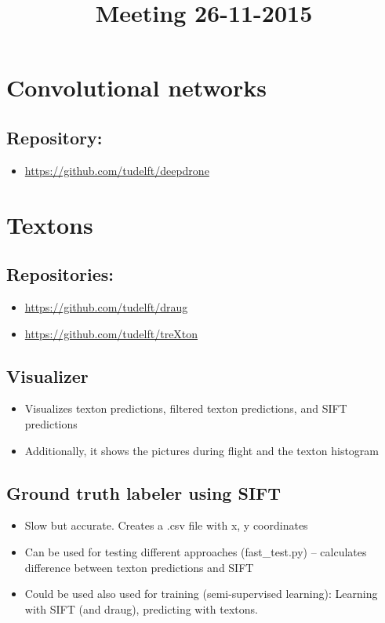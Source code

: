 \documentclass[11pt]{article}
\date{}
\title{Meeting 26-11-2015}
\begin{document}
\maketitle

\section{Convolutional networks}
\label{sec-1}

\subsection{Repository:}
\label{sec-1-1}
\begin{itemize}
\item \url{https://github.com/tudelft/deepdrone}
\end{itemize}

\section{Textons}
\label{sec-2}

\subsection{Repositories:}
\label{sec-2-1}
\begin{itemize}
\item \url{https://github.com/tudelft/draug}
\item \url{https://github.com/tudelft/treXton}
\end{itemize}

\subsection{Visualizer}
\label{sec-2-2}

\begin{itemize}
\item Visualizes texton predictions, filtered texton predictions, and SIFT
predictions
\item Additionally, it shows the pictures during flight and the texton histogram
\end{itemize}

\subsection{Ground truth labeler using SIFT}
\label{sec-2-3}

\begin{itemize}
\item Slow but accurate. Creates a .csv file with x, y coordinates
\item Can be used for testing different approaches (fast\_test.py) --
calculates difference between texton predictions and SIFT
\item Could be used also used for training (semi-supervised learning):
Learning with SIFT (and draug), predicting with textons.
\end{itemize}
\end{document}
